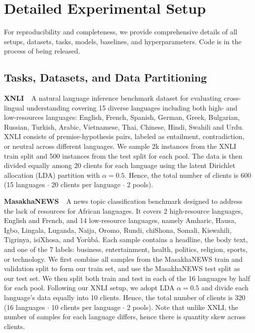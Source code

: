 \appendix
\newpage
\lstset{language=Python,basicstyle=\small\ttfamily,columns=fullflexible}
\section{Detailed Experimental Setup}\label{appendix:experiments}

For reproducibility and completeness, we provide comprehensive details of all setups, datasets, tasks, models, baselines, and hyperparameters. Code is in the process of being released.

\subsection{Tasks, Datasets, and Data Partitioning}

\noindent\textbf{XNLI~\cite{XNLI}}~A natural language inference benchmark dataset for evaluating cross-lingual understanding covering 15 diverse languages including both high- and low-resources languages: English, French, Spanish, German, Greek, Bulgarian, Russian, Turkish, Arabic, Vietnamese, Thai, Chinese, Hindi, Swahili and Urdu. XNLI consists of premise-hypothesis pairs, labeled as entailment, contradiction, or neutral across different languages. We sample 2k instances from the XNLI train split and 500 instances from the test split for each pool. The data is then divided equally among 20 clients for each language using the latent Dirichlet allocation (LDA) partition with $\alpha=0.5$. Hence, the total number of clients is 600 (15 languages $\cdot$ 20 clients per language $\cdot$ 2 pools).

\noindent\textbf{MasakhaNEWS~\cite{MasakhaNEWS}}~A news topic classification benchmark designed to address the lack of resources for African languages. It covers 2 high-resource languages, English and French, and 14 low-resource languages, namely Amharic, Hausa, Igbo, Lingala, Luganda, Naija, Oromo, Rundi, chiShona, Somali, Kiswahili, Tigrinya, isiXhosa, and Yorùbá. Each sample contains a headline, the body text, and one of the 7 labels: business, entertainment, health, politics, religion, sports, or technology. We first combine all samples from the MasakhaNEWS train and validation split to form our train set, and use the MasakhaNEWS test split as our test set. We then split both train and test in each of the 16 languages by half for each pool. Following our XNLI setup, we adopt LDA $\alpha=0.5$ and divide each language's data equally into 10 clients. Hence, the total number of clients is 320 (16 languages $\cdot$ 10 clients per language $\cdot$ 2 pools). Note that unlike XNLI, the number of samples for each language differs, hence there is quantity skew across clients. 

